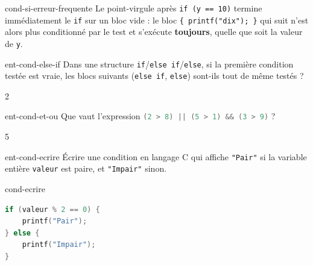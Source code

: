 \begin{UPSTIcorrectionP}{cond-si-erreur-frequente}
    Le point-virgule après \texttt{if (y == 10)} termine immédiatement le \texttt{if} sur un bloc vide : le bloc \texttt{\{ printf("dix"); \}} qui suit n'est alors plus conditionné par le test et s'exécute \textbf{toujours}, quelle que soit la valeur de \texttt{y}.
\end{UPSTIcorrectionP}

\begin{question}{ent-cond-else-if}
    Dans une structure \texttt{if}/\texttt{else if}/\texttt{else}, si la première condition testée est vraie, les blocs suivants (\texttt{else if}, \texttt{else}) sont-ils tout de même testés ?
    \begin{multicols}{2}
        \begin{reponses}
        \end{reponses}
    \end{multicols}
\end{question}

\begin{question}{ent-cond-et-ou}
    Que vaut l'expression \lstinline[language=C]!(2 > 8) || (5 > 1) && (3 > 9)! ?
    \begin{multicols}{5}
        \begin{reponses}
        \end{reponses}
    \end{multicols}
\end{question}

\begin{question}{ent-cond-ecrire}
    Écrire une condition en langage C qui affiche \texttt{"Pair"} si la variable entière \texttt{valeur} est paire, et \texttt{"Impair"} sinon.
\end{question}

\begin{UPSTIcorrectionP}{cond-ecrire}
    \begin{lstlisting}[language=c]
if (valeur % 2 == 0) {
    printf("Pair");
} else {
    printf("Impair");
}
    \end{lstlisting}
\end{UPSTIcorrectionP}
